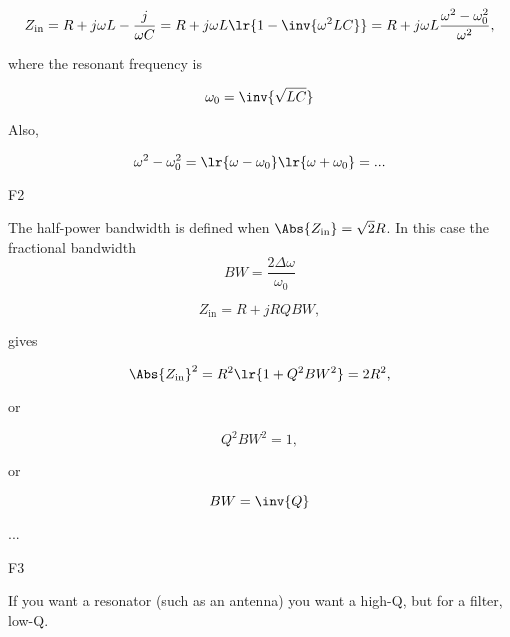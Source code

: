 \begin{dmath}\label{eqn:uwavesDeck8ResonatorQfactorCore:160}
Z_{\textrm{in}} 
= R + j \omega L - \frac{j}{\omega C}
= R + j \omega L \lr{ 1 - \inv{\omega^2 L C} }
= R + j \omega L \frac{\omega^2 - \omega_0^2}{\omega^2}, 
\end{dmath}

where the resonant frequency is

\begin{dmath}\label{eqn:uwavesDeck8ResonatorQfactorCore:180}
\omega_0 = \inv{\sqrt{LC}}
\end{dmath}

Also, 

\begin{dmath}\label{eqn:uwavesDeck8ResonatorQfactorCore:200}
\omega^2 - \omega_0^2 = \lr{ \omega - \omega_0 }\lr{ \omega + \omega_0 }
= 
...
\end{dmath}

F2

The half-power bandwidth is defined when \( \Abs{Z_{\textrm{in}}} = \sqrt{2} R \).  In this case the fractional bandwidth 
\begin{dmath}\label{eqn:uwavesDeck8ResonatorQfactorCore:220}
BW = \frac{2 \Delta \omega}{\omega_0}
\end{dmath}

\begin{dmath}\label{eqn:uwavesDeck8ResonatorQfactorCore:240}
Z_{\textrm{in}} = R + j R Q BW, 
\end{dmath}

gives

\begin{dmath}\label{eqn:uwavesDeck8ResonatorQfactorCore:260}
\Abs{Z_{\textrm{in}}}^2 = R^2\lr{ 1 + Q^2 BW^2 } = 2 R^2,
\end{dmath}

or

\begin{dmath}\label{eqn:uwavesDeck8ResonatorQfactorCore:280}
Q^2 BW^2 = 1,
\end{dmath}

or

\begin{dmath}\label{eqn:uwavesDeck8ResonatorQfactorCore:300}
BW = \inv{Q}
\end{dmath}

...

F3

If you want a resonator (such as an antenna) you want a high-Q, but for a filter, low-Q.

